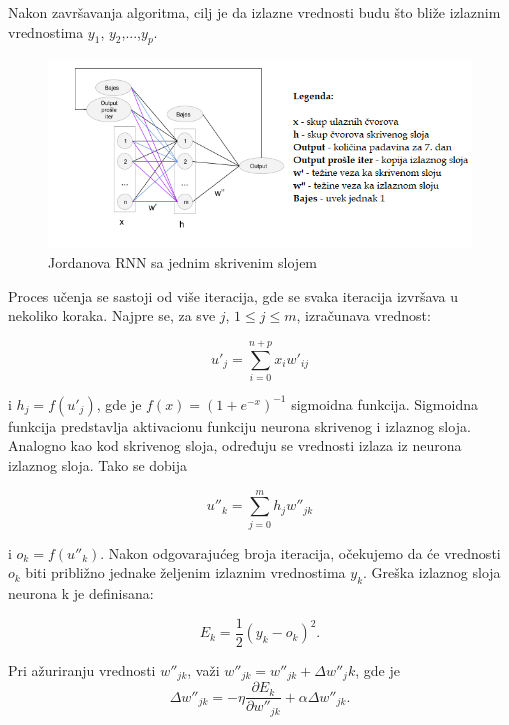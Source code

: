 \documentclass[a4paper]{article}
\begin{document}
Nakon završavanja algoritma, cilj je da izlazne vrednosti budu što bliže izlaznim vrednostima $y_1$, $y_2$,...,$y_p$.

\begin{figure}[h!]
\begin{center}
\includegraphics[scale=0.7]{net.png}
\end{center}
\caption{Jordanova RNN sa jednim skrivenim slojem}
\end{figure}

Proces učenja se sastoji od više iteracija, gde se svaka iteracija izvršava u nekoliko koraka. Najpre se, za sve $j$, $1\leq{}j\leq{}m$, izračunava vrednost:

\begin{equation}
u'_j = \sum_{i=0}^{n+p}x_iw'_{ij}
\end{equation}
 
i $h_j= f(u'_j)$, gde je $f(x)=(1+e^{-x})^{-1}$ sigmoidna funkcija. Sigmoidna funkcija predstavlja aktivacionu funkciju neurona skrivenog i izlaznog sloja. Analogno kao kod skrivenog sloja, određuju se vrednosti izlaza iz neurona izlaznog sloja. Tako se dobija 

\begin{equation}
u{''}_k = \sum_{j=0}^{m}h_jw{''}_{jk}
\end{equation}
 
i $o_k= f(u{''}_k)$. Nakon odgovarajućeg broja iteracija, očekujemo da će vrednosti $o_k$ biti približno jednake željenim izlaznim vrednostima $y_k$.
Greška izlaznog sloja neurona k je definisana:

\begin{equation}
E_k = \frac{1}{2}(y_k - o_k)^2.
\end{equation}

Pri ažuriranju vrednosti $w{''}_{jk}$, važi $w{''}_{jk}=w{''}_{jk}+\Delta{}w{''}_jk$, gde je
$$\Delta{} w{''}_{jk}=- \eta{}\frac{\partial{}E_k}{\partial{}w{''}_{jk}}+\alpha{}\Delta{}w{''}_{jk}.$$
\end{document}
